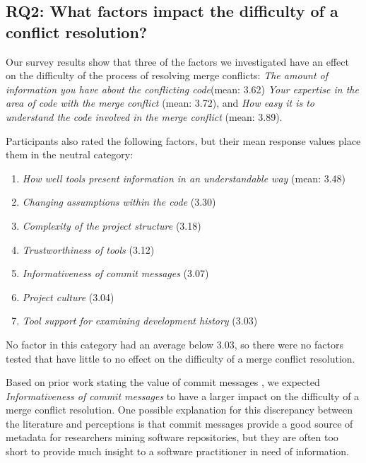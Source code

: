 \subsection{\textbf{RQ2:} What factors impact the difficulty of a conflict resolution?}\label{RQ2}


Our survey results show that three of the factors we investigated have an effect on the difficulty of the process of resolving merge conflicts: \textit{The amount of information you have about the conflicting code}(mean: 3.62) \textit{Your expertise in the area of code with the merge conflict} (mean: 3.72), and \textit{How easy it is to understand the code involved in the merge conflict} (mean: 3.89). 

Participants also rated the following factors, but their mean response values place them in the neutral category:
\begin{enumerate}
	\item \textit{How well tools present information in an understandable way} (mean: 3.48)
	\item \textit{Changing assumptions within the code} (3.30)
	\item \textit{Complexity of the project structure} (3.18)
	\item \textit{Trustworthiness of tools} (3.12)
	\item \textit{Informativeness of commit messages} (3.07)
	\item \textit{Project culture} (3.04)
	\item \textit{Tool support for examining development history} (3.03)
\end{enumerate}

No factor in this category had an average below 3.03, so there were no factors tested that have little to no effect on the difficulty of a merge conflict resolution.

Based on prior work stating the value of commit messages \cite{yamauchi2014clustering} \cite{hindle2009automatic} \cite{cortes2014automatically} \cite{hattori2008nature}, we expected \textit{Informativeness of commit messages} to have a larger impact on the difficulty of a merge conflict resolution. One possible explanation for this discrepancy between the literature and perceptions is that commit messages provide a good source of metadata for researchers mining software repositories, but they are often too short to provide much insight to a software practitioner in need of information.